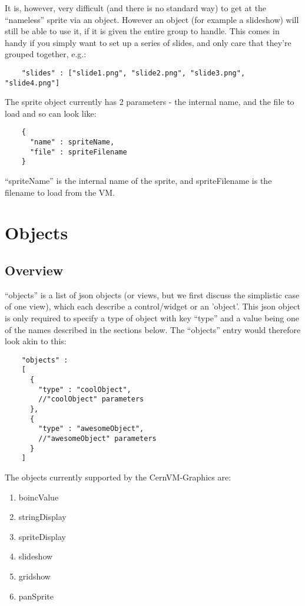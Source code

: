 \documentclass[a4paper]{article}
\newcommand{\cernvmgraphics}{CernVM-Graphics}
\begin{document}
  It is, however, very difficult (and there is no standard way) to get at
  the ``nameless'' sprite via an object. However an object (for example a
  slideshow) will still be able to use it, if it is given the entire group
  to handle. This comes in handy if you simply want to set up a series of
  slides, and only care that they're grouped together, e.g.:

  \begin{verbatim}
    "slides" : ["slide1.png", "slide2.png", "slide3.png", "slide4.png"]
  \end{verbatim}

  The sprite object currently has 2 parameters - the internal name, and the
  file to load and so can look like:

  \begin{verbatim}
    {
      "name" : spriteName,
      "file" : spriteFilename
    }
  \end{verbatim}

  ``spriteName'' is the internal name of the sprite, and spriteFilename is 
  the filename to load from the VM.


\section{Objects} 
\subsection{Overview}
  ``objects'' is a list of json objects (or views, but we first discuss the
  simplistic case of one view), which each describe a control/widget
  or an 'object'. This json object is only required to specify a type of 
  object with key ``type'' and a value being one of the names described in 
  the sections below. The ``objects'' entry would therefore look akin to 
  this:

  \begin{verbatim}
    "objects" :
    [
      {
        "type" : "coolObject",
        //"coolObject" parameters
      },
      {
        "type" : "awesomeObject",
        //"awesomeObject" parameters
      }
    ]
  \end{verbatim}

  The objects currently supported by the \cernvmgraphics{} are:
  \begin{enumerate}
    \item boincValue
    \item stringDisplay
    \item spriteDisplay
    \item slideshow
    \item gridshow
    \item panSprite
  \end{enumerate}
\end{document}
